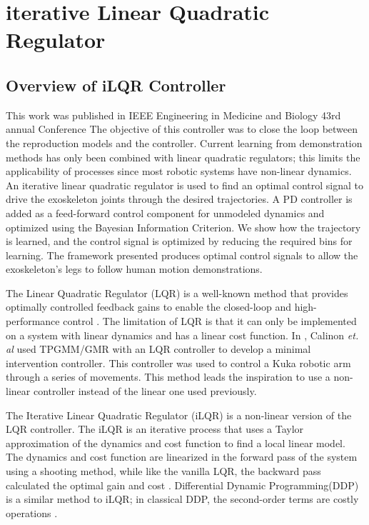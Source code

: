 \section{iterative Linear Quadratic Regulator}
\label{sec:ilqr}

\subsection{Overview of iLQR Controller}
This work was published in IEEE Engineering in Medicine and Biology 43rd annual Conference \cite{goldfarb2021control}
The objective of this controller was to close the loop between the reproduction models and the controller. Current learning from demonstration methods has only been combined with linear quadratic regulators; this limits the applicability of processes since most robotic systems have non-linear dynamics. An iterative linear quadratic regulator is used to find an optimal control signal to drive the exoskeleton joints through the desired trajectories. A PD controller is added as a feed-forward control component for unmodeled dynamics and optimized using the Bayesian Information Criterion. We show how the trajectory is learned, and the control signal is optimized by reducing the required bins for learning. The framework presented produces optimal control signals to allow the exoskeleton's legs to follow human motion demonstrations.

The Linear Quadratic Regulator (LQR) is a well-known method that provides optimally controlled feedback gains to enable the closed-loop and high-performance control \cite{kirk2004optimal}. The limitation of LQR is that it can only be implemented on a system with linear dynamics and has a linear cost function. In \cite{TPGMM_calinon2016}, Calinon \textit{et. al} used TPGMM/GMR with an LQR controller to develop a minimal intervention controller. This controller was used to control a Kuka robotic arm \cite{schreiber2010fast} through a series of movements. This method leads the inspiration to use a non-linear controller instead of the linear one used previously.  

The Iterative Linear Quadratic Regulator (iLQR) is a non-linear version of the LQR controller. The iLQR is an iterative process that uses a Taylor approximation of the dynamics and cost function to find a local linear model. The dynamics and cost function are linearized in the forward pass of the system using a shooting method, while like the vanilla LQR, the backward pass calculated the optimal gain and cost \cite{iLQR_paper}. Differential Dynamic Programming(DDP) is a similar method to iLQR; in classical DDP, the second-order terms are costly operations \cite{iLQR_tassa2014}  \cite{iLQR_Zachary2016}.

